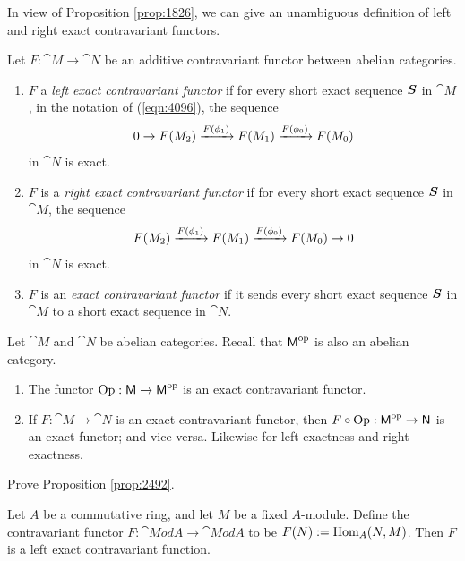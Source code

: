 In view of Proposition \ref{prop:1826}, we can give an unambiguous definition 
of left and right exact contravariant functors. 

\begin{dfn} \label{dfn:4096}
Let $F : \cat{M} \to \cat{N}$ be an additive contravariant functor between 
abelian categories. 
\begin{enumerate}
\item $F$ a {\em left exact contravariant functor} if for 
every short exact sequence $\boldsymbol{S}$ in $\cat{M}$, in the notation of 
(\ref{eqn:4096}), the sequence 
\[ 0 \to F(M_2) \xrightarrow{F(\phi_1)} F(M_1) \xrightarrow{F(\phi_0)} F(M_0) \]
in $\cat{N}$ is exact. 

\item $F$ is a {\em right exact contravariant functor} 
if for every short exact sequence $\boldsymbol{S}$ in $\cat{M}$, the sequence 
\[ F(M_2) \xrightarrow{F(\phi_1)} F(M_1) \xrightarrow{F(\phi_0)} F(M_0) \to 0 \]
in $\cat{N}$ is exact.

\item $F$ is an {\em exact contravariant functor} if it sends every short 
exact sequence $\boldsymbol{S}$ in $\cat{M}$ to a short exact sequence in $\cat{N}$. 
\end{enumerate}
\end{dfn}

\begin{prop} \label{prop:2492} 
Let $\cat{M}$ and $\cat{N}$ be abelian categories. 
Recall that $\operatorname{\mathsf{M}}^{\mathrm{op}}$ is also an abelian category.

\begin{enumerate}
\item The functor $\operatorname{Op} : \operatorname{\mathsf{M}} \to \operatorname{\mathsf{M}}^{\mathrm{op}}$
is an exact contravariant functor. 

\item If $F : \cat{M} \to \cat{N}$ is an exact contravariant functor, then 
$F \circ \operatorname{Op} : \operatorname{\mathsf{M}}^{\mathrm{op}} \to  \operatorname{\mathsf{N}}$
is an exact functor; and vice versa. Likewise for left exactness and right 
exactness. 
\end{enumerate}
\end{prop}

\begin{exer} 
Prove Proposition \ref{prop:2492}.
\end{exer}

\begin{exa} \label{exa:4682}
Let $A$ be a commutative ring, and let $M$ be a fixed $A$-module. 
Define the contravariant functor $F : \cat{Mod} A \to \cat{Mod} A$ to be 
$F(N) := \operatorname{Hom}_A(N, M)$.
Then $F$ is a left exact contravariant function.
\end{exa}


